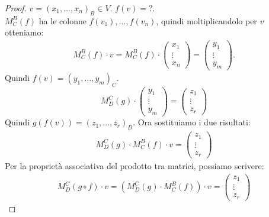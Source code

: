 \documentclass[a4paper]{article}
\theoremstyle{definition}
\begin{document}
\begin{proof}
	$v = (x_1, ..., x_n)_B \in V$. $f(v) = ?$. \\
	$M_C^B(f)$ ha le colonne $f(v_1), ..., f(v_n)$, quindi moltiplicandolo per $v$ otteniamo:
	\begin{align*}
		M_C^B(f) \cdot v = M_C^B(f) \cdot \begin{pmatrix}
			x_1 \\
			\vdots \\
			x_n
		\end{pmatrix} = \begin{pmatrix}
			y_1 \\
			\vdots \\
			y_m
		\end{pmatrix}.
	\end{align*}
	Quindi $f(v) = (y_1, ..., y_m)_C$.
	\[ M_D^C(g) \cdot \begin{pmatrix}
		y_1 \\
		\vdots \\
		y_m
	\end{pmatrix} = \begin{pmatrix}
		z_1 \\
		\vdots \\
		z_r
	\end{pmatrix} \]
	Quindi $g(f(v)) = (z_1, ..., z_r)_D$.
	Ora sostituiamo i due risultati:
	\begin{align*}
		M_D^C(g) \cdot M_C^B(f) \cdot v = \begin{pmatrix}
			z_1 \\
			\vdots \\
			z_r
		\end{pmatrix}
	\end{align*}
	Per la proprietà associativa del prodotto tra matrici, possiamo scrivere:
	\begin{align*}
		M_D^C(g \circ f) \cdot v = (M_D^C(g) \cdot M_C^B(f)) \cdot v = \begin{pmatrix}
			z_1 \\
			\vdots \\
			z_r
		\end{pmatrix}
	\end{align*}
\end{proof}
\end{document}
